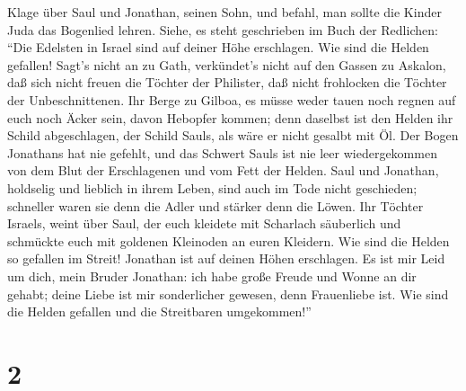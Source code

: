 Klage über Saul und Jonathan, seinen Sohn,  und befahl, man
sollte die Kinder Juda das Bogenlied lehren. Siehe, es steht geschrieben
im Buch der Redlichen:  ``Die Edelsten in Israel sind auf
deiner Höhe erschlagen. Wie sind die Helden gefallen! 
Sagt's nicht an zu Gath, verkündet's nicht auf den Gassen zu Askalon,
daß sich nicht freuen die Töchter der Philister, daß nicht frohlocken
die Töchter der Unbeschnittenen.  Ihr Berge zu Gilboa, es
müsse weder tauen noch regnen auf euch noch Äcker sein, davon Hebopfer
kommen; denn daselbst ist den Helden ihr Schild abgeschlagen, der Schild
Sauls, als wäre er nicht gesalbt mit Öl.  Der Bogen
Jonathans hat nie gefehlt, und das Schwert Sauls ist nie leer
wiedergekommen von dem Blut der Erschlagenen und vom Fett der Helden.
 Saul und Jonathan, holdselig und lieblich in ihrem Leben,
sind auch im Tode nicht geschieden; schneller waren sie denn die Adler
und stärker denn die Löwen.  Ihr Töchter Israels, weint
über Saul, der euch kleidete mit Scharlach säuberlich und schmückte euch
mit goldenen Kleinoden an euren Kleidern.  Wie sind die
Helden so gefallen im Streit! Jonathan ist auf deinen Höhen erschlagen.
 Es ist mir Leid um dich, mein Bruder Jonathan: ich habe
große Freude und Wonne an dir gehabt; deine Liebe ist mir sonderlicher
gewesen, denn Frauenliebe ist.  Wie sind die Helden
gefallen und die Streitbaren umgekommen!''

\hypertarget{section-1}{%
\section{2}\label{section-1}}

